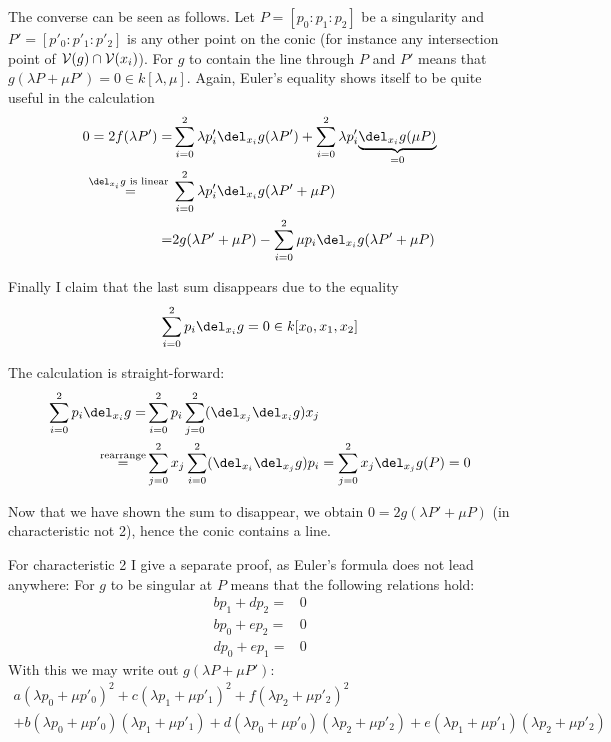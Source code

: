 The converse can be seen as follows. Let $P=[p_0:p_1:p_2]$ be a singularity and $P'=[p'_0:p'_1:p'_2]$ is any other point on the conic (for instance any intersection point of $\operatorname{\mathcal V}(g) \cap \operatorname{\mathcal V}(x_i)$).
For $g$ to contain the line through $P$ and $P'$ means that $g(\lambda P + \mu P') = 0 \in k[\lambda,\mu]$.
Again, Euler's equality shows itself to be quite useful in the calculation
\begin{align}
0
= 2f(\lambda P')
=& \sum_{i=0}^2 \lambda p'_i \del_{x_i}g(\lambda P') 
+ \sum_{i=0}^2 \lambda p'_i \underset{=0}{\underbrace{\del_{x_i}g(\mu P)}}
\\
\overset{\del_{x_i}g\text{ is linear }}=& \sum_{i=0}^2 \lambda p'_i \del_{x_i} g(\lambda P'+\mu P) 
\\
=& 2g(\lambda P' + \mu P) - \sum_{i=0}^2 \mu p_i \del_{x_i}g(\lambda P' + \mu P)
\end{align}

Finally I claim that the last sum disappears due to the equality
\begin{equation}
\sum_{i=0}^2 p_i \del_{x_i}g = 0 \in k[x_0,x_1,x_2]
\end{equation}

The calculation is straight-forward:
\begin{align}
\sum_{i=0}^2 p_i \del_{x_i} g
=& \sum_{i=0}^2 p_i \sum_{j=0}^2 (\del_{x_j}\del_{x_i}g)x_j
\\
\overset{\text{rearrange}}=& \sum_{j=0}^2 x_j \sum_{i=0}^2 (\del_{x_i}\del_{x_j}g)p_i = \sum_{j=0}^2 x_j \del_{x_j}g(P) = 0
\end{align}

Now that we have shown the sum to disappear, we obtain $0 = 2g(\lambda P' + \mu P)$ (in characteristic not 2), hence the conic contains a line.

For characteristic 2 I give a separate proof, as Euler's formula does not lead anywhere:
For $g$ to be singular at $P$ means that the following relations hold:
\begin{align}
bp_1 + dp_2 =& 0\\
bp_0 + ep_2 =& 0\\
dp_0 + ep_1 =& 0
\end{align}
With this we may write out $g(\lambda P + \mu P')$:
\begin{align}
a(\lambda p_0 + \mu p'_0)^2
+c(\lambda p_1 + \mu p'_1)^2
+f(\lambda p_2 + \mu p'_2)^2 \\
+b (\lambda p_0 + \mu p'_0)(\lambda p_1 + \mu p'_1)
+d (\lambda p_0 + \mu p'_0)(\lambda p_2 + \mu p'_2)
+e (\lambda p_1 + \mu p'_1)(\lambda p_2 + \mu p'_2)
\end{align}

